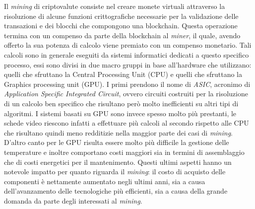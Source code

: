 \documentclass[conference, italian]{IEEEtran}
\begin{document}
Il \emph{mining} di criptovalute consiste nel creare monete virtuali attraverso la risoluzione di alcune funzioni crittografiche necessarie per la validazione delle transazioni e dei blocchi che compongono una blockchain. Questa operazione termina con un compenso da parte della blockchain al \emph{miner}, il quale, avendo offerto la sua potenza di calcolo viene premiato con un compenso monetario. Tali calcoli sono in generale eseguiti da sistemi informatici dedicati a questo specifico processo, essi sono divisi in due macro gruppi in base all'hardware che utilizzano: quelli che sfruttano la Central Processing Unit (CPU) e quelli che sfruttano la Graphics processing unit (GPU). I primi prendono il nome di \emph{ASIC}, acronimo di \emph{Application Specific Integrated Circuit}, ovvero circuiti costruiti per la risoluzione di un calcolo ben specifico che risultano però molto inefficienti su altri tipi di algoritmi. I sistemi basati su GPU sono invece spesso molto più prestanti, le schede video riescono infatti a effettuare più calcoli al secondo rispetto alle CPU che risultano quindi meno redditizie nella maggior parte dei casi di \emph{mining}. D'altro canto per le GPU risulta essere molto più difficile la gestione delle temperature e inoltre comportano costi maggiori sia in termini di assemblaggio che di costi energetici per il mantenimento. Questi ultimi aspetti hanno un notevole impatto per quanto riguarda il \emph{mining}: il costo di acquisto delle componenti è nettamente aumentato negli ultimi anni, sia a causa dell'avanzamento delle tecnologiche più efficienti, sia a causa della grande domanda da parte degli interessati al \emph{mining}.\\
\end{document}
